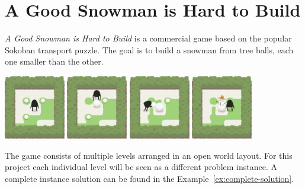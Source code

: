 \documentclass{report}
\theoremstyle{plain}
\begin{document}
\section{A Good Snowman is Hard to Build}
\emph{A Good Snowman is Hard to Build} is a commercial game based on the popular Sokoban transport puzzle. The goal is to build a snowman from tree balls, each one smaller than the other. 

\begin{center}
\includegraphics[width=0.2\textwidth]{andy-1.png}
\includegraphics[width=0.2\textwidth]{andy-2.png}
\includegraphics[width=0.2\textwidth]{andy-3.png}
\includegraphics[width=0.2\textwidth]{andy-4.png}
\end{center}

The game consists of multiple levels arranged in an open world layout. For this project each individual level will be seen as a different problem instance. A complete instance solution can be found in the Example~\ref{ex:complete-solution}.
\end{document}

